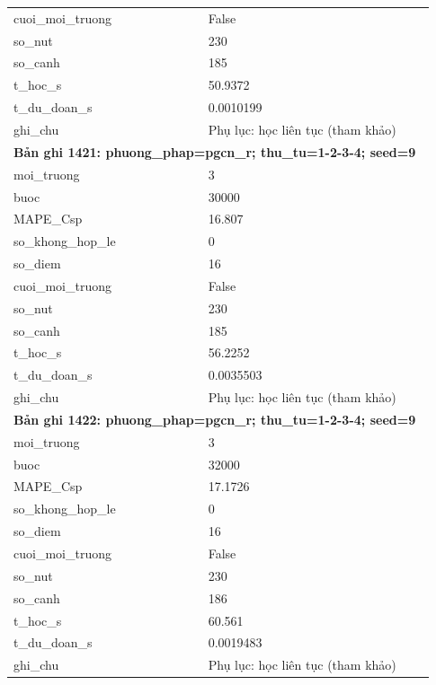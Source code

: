 \begin{longtable}{p{0.43\linewidth}p{0.50\linewidth}}
cuoi\_\allowbreak moi\_\allowbreak truong & False \\
so\_\allowbreak nut & 230 \\
so\_\allowbreak canh & 185 \\
t\_\allowbreak hoc\_\allowbreak s & 50.9372 \\
t\_\allowbreak du\_\allowbreak doan\_\allowbreak s & 0.0010199 \\
ghi\_\allowbreak chu & Phụ lục: học liên tục (tham khảo) \\
\midrule
\multicolumn{2}{p{0.95\linewidth}}{\textbf{Bản ghi 1421: phuong\_phap=pgcn\_r; thu\_tu=1-2-3-4; seed=9}} \\
moi\_\allowbreak truong & 3 \\
buoc & 30000 \\
MAPE\_\allowbreak Csp & 16.807 \\
so\_\allowbreak khong\_\allowbreak hop\_\allowbreak le & 0 \\
so\_\allowbreak diem & 16 \\
cuoi\_\allowbreak moi\_\allowbreak truong & False \\
so\_\allowbreak nut & 230 \\
so\_\allowbreak canh & 185 \\
t\_\allowbreak hoc\_\allowbreak s & 56.2252 \\
t\_\allowbreak du\_\allowbreak doan\_\allowbreak s & 0.0035503 \\
ghi\_\allowbreak chu & Phụ lục: học liên tục (tham khảo) \\
\midrule
\multicolumn{2}{p{0.95\linewidth}}{\textbf{Bản ghi 1422: phuong\_phap=pgcn\_r; thu\_tu=1-2-3-4; seed=9}} \\
moi\_\allowbreak truong & 3 \\
buoc & 32000 \\
MAPE\_\allowbreak Csp & 17.1726 \\
so\_\allowbreak khong\_\allowbreak hop\_\allowbreak le & 0 \\
so\_\allowbreak diem & 16 \\
cuoi\_\allowbreak moi\_\allowbreak truong & False \\
so\_\allowbreak nut & 230 \\
so\_\allowbreak canh & 186 \\
t\_\allowbreak hoc\_\allowbreak s & 60.561 \\
t\_\allowbreak du\_\allowbreak doan\_\allowbreak s & 0.0019483 \\
ghi\_\allowbreak chu & Phụ lục: học liên tục (tham khảo) \\

\end{longtable}
